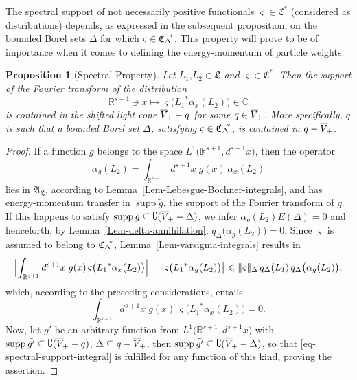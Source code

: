 \documentclass[11pt,twoside,openright]{report}
\theoremstyle{definition}
\theoremstyle{plain}
\newtheorem{Pro}[Def]{Proposition}
\theoremstyle{remark}
\theoremstyle{assumption}
\DeclareMathOperator{\supp}{supp}
\newcommand{\babs}[1]{\bigl\lvert #1 \bigr\rvert}
\newcommand{\Babs}[1]{\Bigl\lvert #1 \Bigr\rvert}
\newcommand{\norm}[1]{\lVert #1 \rVert}
\newcommand{\qDx}[1]{q_\Delta ( #1 )}
\newcommand{\bqDx}[1]{q_\Delta \bigl( #1 \bigr)}
\newcommand{\Cbb}{\mathbb{C}}
\newcommand{\Lfrak}{\mathfrak{L}}
\newcommand{\Rsone}{\mathbb{R}^{s + 1}}
\newcommand{\AL}{\mathfrak{A}_\mathfrak{L}}
\newcommand{\fwcone}{\overline{V}_{\negthinspace +}}
\newcommand{\ED}{E ( \Delta )}
\newcommand{\Cstar}{\mathfrak{C}^*}
\newcommand{\CDstar}{{\mathfrak{C}_\Delta}^{\negthickspace *}}
\newcommand{\ax}{\alpha_x}
\begin{document}
The spectral support of not necessarily positive functionals
$\varsigma \in \Cstar$ (considered as distributions) depends, as
expressed in the subsequent proposition, on the bounded Borel sets
$\Delta$ for which $\varsigma \in \CDstar$. This property will prove
to be of importance when it comes to defining the energy-momentum of
particle weights.
\begin{Pro}[Spectral Property]
  \label{Pro-spectral-property}
  Let $L_1 \text{,} L_2 \in \Lfrak$ and $\varsigma \in \Cstar$. Then
  the support of the Fourier transform of the distribution
  \begin{equation*}
    \Rsone \ni x \mapsto \varsigma \bigl( {L_1}^* \ax ( L_2 ) \bigr)
    \in \Cbb
  \end{equation*}
  is contained in the shifted light cone $\fwcone - q$ for some
  $q \in \fwcone$. More specifically, $q$ is such that a bounded Borel
  set $\Delta$, satisfying $\varsigma \in \CDstar$, is contained in $q
  - \fwcone$.
\end{Pro}
\begin{proof}
  If a function $g$ belongs to the space $L^1 \bigl( \Rsone , d^{s +
  1} x \bigr)$, then the operator
  \begin{equation*}
    \alpha_g ( L_2 ) = \int_{\Rsone} d^{s + 1} x \; g ( x ) \,
    \ax ( L_2 )
  \end{equation*}
  lies in $\AL$, according to
  Lemma~\ref{Lem-Lebesgue-Bochner-integrals}, and has energy-momentum
  transfer in $\supp \tilde{g}$, the support of the Fourier transform
  of $g$. If this happens to satisfy $\supp \tilde{g} \subseteq
  \complement ( \fwcone - \Delta )$, we infer $\alpha_g ( L_2 ) \ED =
  0$ and henceforth, by Lemma~\ref{Lem-delta-annihilation},
  $\bqDx{\alpha_g ( L_2 )} = 0$. Since $\varsigma$ is assumed to
  belong to $\CDstar$, Lemma~\ref{Lem-varsigma-integrals} results in
  \begin{equation*}
    \Babs{\int_{\Rsone} d^{s + 1} x \; g ( x ) \, \varsigma \bigl(
    {L_1}^* \ax ( L_2 ) \bigr)} =  \babs{\varsigma \bigl( {L_1}^*
    \alpha_g ( L_2 ) \bigr)} \leqslant \norm{\varsigma}_\Delta \,
    \qDx{L_1} \, \bqDx{\alpha_g ( L_2 )} \text{,}
  \end{equation*}
  which, according to the preceding considerations, entails
  \begin{equation}
    \label{eq-spectral-support-integral}
    \int_{\Rsone} d^{s + 1} x \; g ( x ) \, \varsigma \bigl( {L_1}^*
    \ax ( L_2 ) \bigr) = 0 \text{.}
  \end{equation}
  Now, let $g'$ be an arbitrary function from $L^1 \bigl( \Rsone ,
  d^{s + 1} x \bigr)$ with $\supp \tilde{g'} \subseteq \complement (
  \fwcone - q )$, $\Delta \subseteq q -\fwcone$, then $\supp
  \tilde{g'} \subseteq \complement ( \fwcone - \Delta )$, so that
  \eqref{eq-spectral-support-integral} is fulfilled for any function
  of this kind, proving the assertion.
\end{proof}
\end{document}
